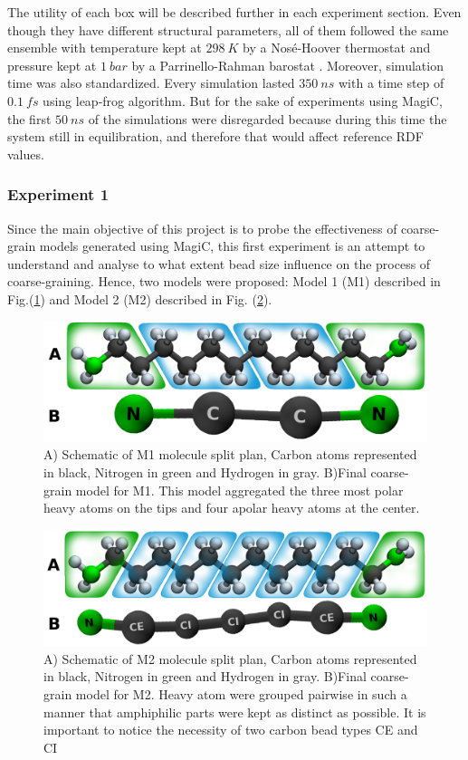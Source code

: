 \documentclass[10pt,a4paper,twoside]{article}
\begin{document}
The utility of each box will be described further in each experiment section. Even though they have different structural parameters, all of them followed the same ensemble with temperature kept at $298\ K$ by a Nosé-Hoover thermostat \cite{nosetstat} and pressure kept at $1\ bar$ by a Parrinello-Rahman barostat \cite{prbstat}. Moreover, simulation time was also standardized. Every simulation lasted $350\ ns$ with a time step of $0.1\ fs$ using leap-frog algorithm. But for the sake of experiments using MagiC, the first $50\ ns$ of the simulations were disregarded because during this time the system still in equilibration, and therefore that would affect reference RDF values.


\subsubsection*{Experiment 1}
 Since the main objective of this project is to probe the effectiveness of coarse-grain models generated using MagiC, this first experiment is an attempt to understand and analyse to what extent bead size influence on the process of coarse-graining. Hence, two models were proposed: Model 1 (M1) described in Fig.(\ref{Fig:mol1}) and Model 2 (M2) described in Fig. (\ref{Fig:mol2}).
 
 \begin{figure}[ht]
	\includegraphics[width=1.0 \textwidth]{./images/M1ab}
	\caption{A) Schematic of M1 molecule split plan, Carbon atoms represented in black, Nitrogen in green and Hydrogen in gray. B)Final coarse-grain model for M1. This model aggregated the three most polar heavy atoms on the tips and four apolar heavy atoms at the center.}
	\label{Fig:mol1}
\end{figure}
 \begin{figure}[ht]
	\includegraphics[width=1.0 \textwidth]{./images/M2ab}
	\caption{A) Schematic of M2 molecule split plan, Carbon atoms represented in black, Nitrogen in green and Hydrogen in gray. B)Final coarse-grain model for M2. Heavy atom were grouped pairwise in such a manner that amphiphilic parts were kept as distinct as possible. It is important to notice the necessity of two carbon bead types CE and CI}
		\label{Fig:mol2}
\end{figure}
 
\end{document}
